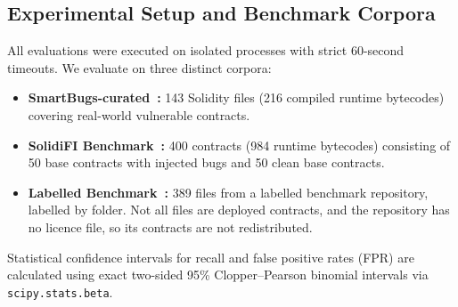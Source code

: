 \documentclass[conference]{IEEEtran}
\begin{document}
\subsection{Experimental Setup and Benchmark Corpora}
All evaluations were executed on isolated processes with strict 60-second timeouts. We evaluate on three distinct corpora:
\begin{itemize}
    \item \textbf{SmartBugs-curated~\cite{durieux2020empirical, ferreira2020smartbugs}:} 143 Solidity files (216 compiled runtime bytecodes) covering real-world vulnerable contracts.
    \item \textbf{SolidiFI Benchmark~\cite{ghaleb2020how}:} 400 contracts (984 runtime bytecodes) consisting of 50 base contracts with injected bugs and 50 clean base contracts.
    \item \textbf{Labelled Benchmark~\cite{bitsmartcontract2023benchmark}:} 389 files from a labelled benchmark repository, labelled by folder. Not all files are deployed contracts, and the repository has no licence file, so its contracts are not redistributed.
\end{itemize}

Statistical confidence intervals for recall and false positive rates (FPR) are calculated using exact two-sided 95\% Clopper--Pearson binomial intervals via \texttt{scipy.stats.beta}.
\end{document}
